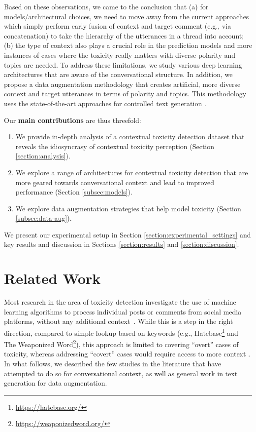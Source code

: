 \documentclass[acmsmall]{acmart}
\newcommand{\red}[1]{\textcolor{black}{#1}}
\begin{document}
Based on these observations, we came to the conclusion that (a) for models/architectural choices, we need to move away from the current approaches which simply perform early fusion of context and target comment (e.g., via concatenation) to take the hierarchy of the utterances in a thread into account; (b) the type of context also plays a crucial role in the prediction models and more instances of cases where the toxicity really matters with diverse polarity and topics are needed. To address these limitations, we study various deep learning architectures that are aware of the conversational structure. In addition, we propose a data augmentation methodology that creates artificial, more diverse context and target utterances in terms of polarity and topics. This methodology uses the state-of-the-art approaches for controlled text generation \cite{gpt-2,style-transformer}. 

Our {\bf main contributions} are thus threefold:
\begin{enumerate}
    \item We provide in-depth analysis of a contextual toxicity detection dataset  \cite{FBK} that reveals the idiosyncrasy of contextual toxicity perception (Section \ref{section:analysis}).
    \item We explore a range of architectures for contextual toxicity detection that are more geared towards conversational context and lead to improved performance (Section \ref{subsec:models}).
    \item We explore data augmentation strategies that help model toxicity (Section \ref{subsec:data-aug}).
\end{enumerate}
We present our experimental setup in Section \ref{section:experimental_settings} and key results and discussion in Sections \ref{section:results} and \ref{section:discussion}.
 
\section{Related Work} \label{section:related-work}

Most research in the area of toxicity detection investigate the use of machine learning algorithms to process individual posts or comments from social media platforms, without any additional context~\cite{zampieri-etal-2020-semeval,waseem-etal-2017-understanding}. While this is a step in the right direction, compared to simple lookup based on keywords (e.g., Hatebase\footnote{\url{https://hatebase.org/}} and The Weaponized Word\footnote{\url{https://weaponizedword.org/}}), this approach is limited to covering ``overt'' cases of toxicity, whereas addressing ``covert'' cases would require  access to more context  \cite{jurgens-etal-2019-just,vidgen-etal-2019-challenges,caselli-EtAl:2020:LREC}. In what follows, we described the few studies in the literature that have attempted to do so for \red{conversational context}, as well as general work in text generation for data augmentation.   
\end{document}
